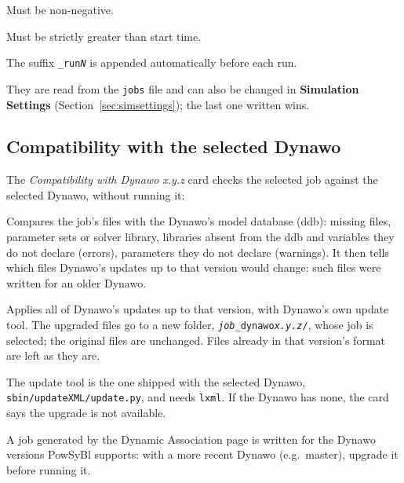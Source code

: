 \documentclass[a4paper,11pt]{article}
\newcommand{\code}[1]{\texttt{\small #1}}
\newcommand{\ftype}[1]{\texttt{\small\color{rteblu}#1}}
\begin{document}
\begin{description}[leftmargin=2em]
  \item[\textbf{Start time (s)}] Must be non-negative.
  \item[\textbf{Stop time (s)}] Must be strictly greater than start time.
  \item[\textbf{Base output directory}] The suffix \code{\_run\textit{N}} is
    appended automatically before each run.
\end{description}

They are read from the \ftype{jobs} file and can also be changed in
\textbf{Simulation Settings} (Section~\ref{sec:simsettings}); the last one
written wins.

\subsection{Compatibility with the selected Dynawo}
\label{sec:compatibility}

The \emph{Compatibility with Dynawo \textit{x.y.z}} card checks the selected
job against the selected Dynawo, without running it:

\begin{description}[leftmargin=2em]
  \item[\textbf{Check}] Compares the job's files with the Dynawo's model
    database (ddb): missing files, parameter sets or solver library, libraries
    absent from the ddb and variables they do not declare (errors), parameters
    they do not declare (warnings). It then tells which files Dynawo's updates
    up to that version would change: such files were written for an older
    Dynawo.
  \item[\textbf{Upgrade to Dynawo \textit{x.y.z}}] Applies all of Dynawo's
    updates up to that version, with Dynawo's own update tool. The upgraded
    files go to a new folder, \code{\textit{job}\_dynawo\textit{x.y.z}/},
    whose job is selected; the original files are unchanged. Files already in
    that version's format are left as they are.
\end{description}

The update tool is the one shipped with the selected Dynawo,
\code{sbin/updateXML/update.py}, and needs \code{lxml}. If the Dynawo has
none, the card says the upgrade is not available.

\begin{notebox}
A job generated by the Dynamic Association page is written for the Dynawo
versions PowSyBl supports: with a more recent Dynawo (e.g.\ master), upgrade it
before running it.
\end{notebox}
\end{document}

